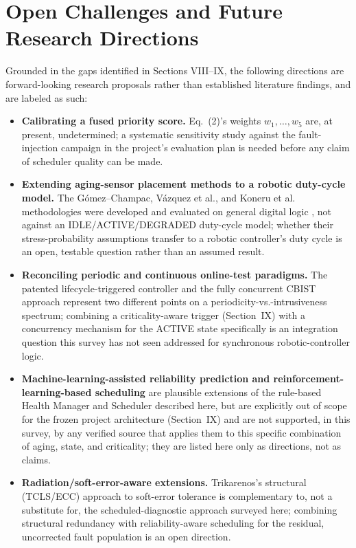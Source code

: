 \documentclass[journal]{IEEEtran}
\begin{document}
\section{Open Challenges and Future Research Directions}
Grounded in the gaps identified in Sections VIII--IX, the following directions are forward-looking research proposals rather than established literature findings, and are labeled as such:
\begin{itemize}
\item \textbf{Calibrating a fused priority score.} Eq.~(2)'s weights $w_1,\ldots,w_5$ are, at present, undetermined; a systematic sensitivity study against the fault-injection campaign in the project's evaluation plan is needed before any claim of scheduler quality can be made.
\item \textbf{Extending aging-sensor placement methods to a robotic duty-cycle model.} The G\'omez--Champac, V\'azquez et al., and Koneru et al. methodologies were developed and evaluated on general digital logic \cite{r4,r13,r6}, not against an IDLE/ACTIVE/DEGRADED duty-cycle model; whether their stress-probability assumptions transfer to a robotic controller's duty cycle is an open, testable question rather than an assumed result.
\item \textbf{Reconciling periodic and continuous online-test paradigms.} The patented lifecycle-triggered controller \cite{r9} and the fully concurrent CBIST approach \cite{r16} represent two different points on a periodicity-vs.-intrusiveness spectrum; combining a criticality-aware trigger (Section~IX) with a concurrency mechanism for the ACTIVE state specifically is an integration question this survey has not seen addressed for synchronous robotic-controller logic.
\item \textbf{Machine-learning-assisted reliability prediction and reinforcement-learning-based scheduling} are plausible extensions of the rule-based Health Manager and Scheduler described here, but are explicitly out of scope for the frozen project architecture (Section~IX) and are not supported, in this survey, by any verified source that applies them to this specific combination of aging, state, and criticality; they are listed here only as directions, not as claims.
\item \textbf{Radiation/soft-error-aware extensions.} Trikarenos's structural (TCLS/ECC) approach to soft-error tolerance \cite{r8} is complementary to, not a substitute for, the scheduled-diagnostic approach surveyed here; combining structural redundancy with reliability-aware scheduling for the residual, uncorrected fault population is an open direction.
\end{itemize}
\end{document}
